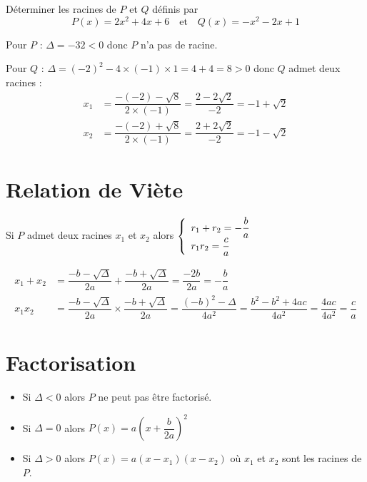 \documentclass[french]{book}
\begin{document}
\begin{exemple}
Déterminer les racines de $P$ et $Q$ définis par
 \[P(x)=2x^{2}+4x+6 \quad \text{et} \quad Q(x)=-x^{2}-2x+1\]
\end{exemple}

Pour $P$ : $\Delta=-32<0$ donc $P$ n'a pas de racine.

Pour $Q$ : $\Delta=(-2)^{2}-4\times (-1)\times 1=4+4=8>0$ donc $Q$ admet deux racines :
\begin{align*}
x_{1}&=\dfrac{-(-2)-\sqrt{8}}{2\times (-1)}=\dfrac{2-2\sqrt{2}}{-2}=-1+\sqrt{2}\\
x_{2}&=\dfrac{-(-2)+\sqrt{8}}{2\times (-1)}=\dfrac{2+2\sqrt{2}}{-2}=-1-\sqrt{2}
\end{align*}



\section{Relation de Viète}
\begin{prop}
Si $P$ admet deux racines $x_{1}$ et $x_{2}$ alors 
$\left\lbrace 
\begin{array}[c]{l}
r_{1}+r_{2}=-\dfrac{b}{a} \\
r_{1}r_{2}=\dfrac{c}{a}
\end{array}
\right.$
\end{prop}

\begin{demo}
\begin{align*}
x_{1}+x_{2}&=\dfrac{-b-\sqrt{\Delta}}{2a}+\dfrac{-b+\sqrt{\Delta}}{2a}=\dfrac{-2b}{2a}=-\dfrac{b}{a}\\
x_{1}x_{2}&=\dfrac{-b-\sqrt{\Delta}}{2a}\times \dfrac{-b+\sqrt{\Delta}}{2a}=\dfrac{(-b)^{2}-\Delta}{4a^{2}}=\dfrac{b^{2}-b^{2}+4ac}{4a^{2}}=\dfrac{4ac}{4a^{2}}=\dfrac{c}{a}
\end{align*}
\end{demo}%

\section{Factorisation}
\begin{prop}
\begin{itemize}
\item Si $\Delta<0$ alors $P$ ne peut pas être factorisé.
\item Si $\Delta=0$ alors $P(x)=a\left(x+\dfrac{b}{2a}\right)^{2}$
\item Si $\Delta>0$ alors $P(x)=a(x-x_{1})(x-x_{2})$ où $x_{1}$ et $x_{2}$ sont les racines de $P$.
\end{itemize}
\end{prop}
\end{document}
